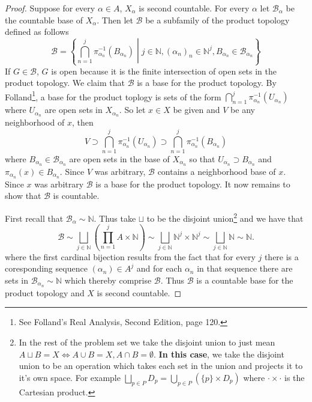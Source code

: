 \documentclass[11pt]{amsart}
\theoremstyle{definition}
\numberwithin{theorem}{section}
\numberwithin{definition}{section}
\numberwithin{equation}{section}
\def\scriptb{{\mathcal B}}
\begin{document}
\begin{proof}
	Suppose for every $\alpha \in A$, $X_\alpha$ is second countable. For every $\alpha$ let $\scriptb_\alpha$ be the
	countable base of $X_\alpha$. Then let $\scriptb$ be a subfamily of the product topology defined as follows
	\begin{equation*}
		\scriptb = \left\{\bigcap_{n=1}^j \pi_{\alpha_n}^{-1}(B_{\alpha_n})\mathrel{}\middle|\mathrel{} j \in \mathbb{N}, (\alpha_n)_n \in \mathbb{N}^j, B_{\alpha_n} \in \scriptb_{\alpha_n}\right\}
	\end{equation*}
	If $G \in \scriptb$, $G$ is open because it is the finite intersection of open sets in the product topology. We claim that $\scriptb$ is a base for the product topology. By Folland\footnote{See Folland's Real Analysis, Second Edition, page 120.}, a base for the product toplogy is sets of the form $\bigcap_{n=1}^j \pi^{-1}_{\alpha_n}(U_{\alpha_n})$ where $U_{\alpha_n}$ are open sets in $X_{\alpha_n}.$ So let $x \in X$ be given and $V$ be any neighborhood of $x$, then
	\begin{equation*}
	  	V \supset \bigcap_{n=1}^j \pi^{-1}_{\alpha_n}(U_{\alpha_n}) \supset \bigcap_{n=1}^j \pi_{\alpha_n}^{-1}(B_{\alpha_n}) 
	  \end{equation*}  
	  where $B_{\alpha_n} \in \scriptb_{\alpha_n}$ are open sets in the base of $X_{\alpha_n}$ so that $U_{\alpha_n} \supset B_{\alpha_n}$ and $\pi_{\alpha_n}(x) \in B_{\alpha_n}.$ Since $V$ was arbitrary, $\scriptb$ contains a neighborhood base of $x$. Since $x$ was arbitrary $\scriptb$ is a base for the product topology. It now remains to show that $\scriptb$ is countable.

	  First recall that $\scriptb_{\alpha} \sim \mathbb{N}$. Thus take $\sqcup$ to be the disjoint union\footnote{In the rest of the problem set we take the disjoint union to just mean $A \sqcup B = X \iff A \cup B = X, A \cap B = \emptyset$. \textbf{In this case}, we take the disjoint union to be an operation which takes each set in the union and projects it to it's own space. For example $\bigsqcup_{p \in P} D_p = \bigcup_{p\in P} (\{p\} \times D_p) $ where $\cdot \times \cdot$ is the Cartesian product.} and we have that
	  \begin{equation*}
	  	\scriptb \sim \bigsqcup_{j \in \mathbb{N}} \left(\prod_{n=1}^j A \times \mathbb{N}\right) \sim \bigsqcup_{j \in \mathbb{N}}  \mathbb{N}^j \times \mathbb{N}^j \sim  \bigsqcup_{j \in \mathbb{N}} \mathbb{N} \sim \mathbb{N}.
	  \end{equation*}
	  where the first cardinal bijection results from the fact that for every $j$ there is a coresponding sequence $(\alpha_n) \in A^j$ and for each $\alpha_n$ in that sequence there are sets in $\scriptb_{\alpha_n} \sim \mathbb{N}$ which thereby comprise $\scriptb.$ Thus $\scriptb$ is a countable base for the product topology and $X$ is second countable.
\end{proof}
\end{document}
